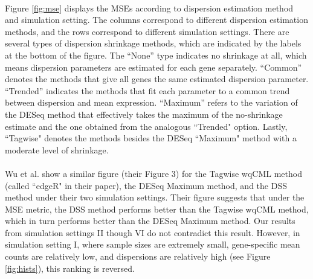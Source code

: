 \documentclass[10pt]{article}
\begin{document}
\paragraph{} \indent Figure \ref{fig:mse} displays the MSEs according to dispersion estimation method and simulation setting. The columns correspond to different dispersion estimation methods, and the rows correspond to different simulation settings. There are several types of dispersion shrinkage methods, {\color{blue} which are indicated by the labels at the bottom of the figure.} %
 The ``None'' type indicates no shrinkage at all, which means dispersion parameters are estimated for each gene separately. ``Common'' denotes the methods that give all genes the same estimated dispersion parameter. ``Trended'' indicates the methods that fit each parameter to a common trend between dispersion and mean expression. ``Maximum'' refers to the variation of the DESeq method that effectively takes the maximum of the no-shrinkage estimate and the one obtained from the analogous ``Trended" option. Lastly, ``Tagwise" denotes the methods besides the DESeq ``Maximum" method with a moderate level of shrinkage.
 
 
 
 
 
 {\color{blue}
\paragraph{} \indent Wu et al. \cite{dss} show a similar figure (their Figure 3) for the Tagwise wqCML method (called ``edgeR" in their paper), the DESeq Maximum method, and the DSS method under their two simulation settings. Their figure suggests that under the MSE metric, the DSS method performs better than the Tagwise wqCML method, which in turn performs better than the DESeq Maximum method. Our results from simulation settings II though VI do not contradict this result. However, in simulation setting I, where sample sizes are extremely small, gene-specific mean counts are relatively low, and dispersions are relatively high (see Figure \ref{fig:hists}), this ranking is reversed.}
\end{document}
